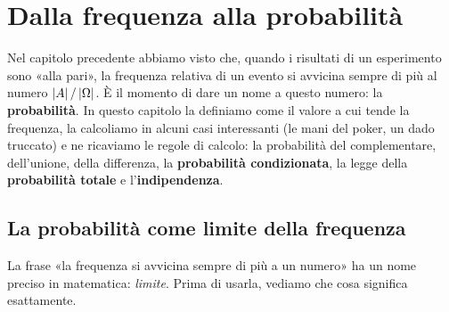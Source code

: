\chapter{Dalla frequenza alla probabilità}

Nel capitolo precedente abbiamo visto che, quando i risultati di un esperimento sono «alla pari», la frequenza
relativa di un evento si avvicina sempre di più al numero $\left\lvert A \right\rvert/\left\lvert \Omega \right\rvert$. È il momento di dare un nome a
questo numero: la \textbf{probabilità}. In questo capitolo la definiamo come il valore a cui tende la frequenza,
la calcoliamo in alcuni casi interessanti (le mani del poker, un dado truccato) e ne ricaviamo le regole di calcolo:
la probabilità del complementare, dell'unione, della differenza, la \textbf{probabilità condizionata}, la legge della
\textbf{probabilità totale} e l'\textbf{indipendenza}.

\section{La probabilità come limite della frequenza}

La frase «la frequenza si avvicina sempre di più a un numero» ha un nome preciso in matematica: \emph{limite}. Prima
di usarla, vediamo che cosa significa esattamente.


